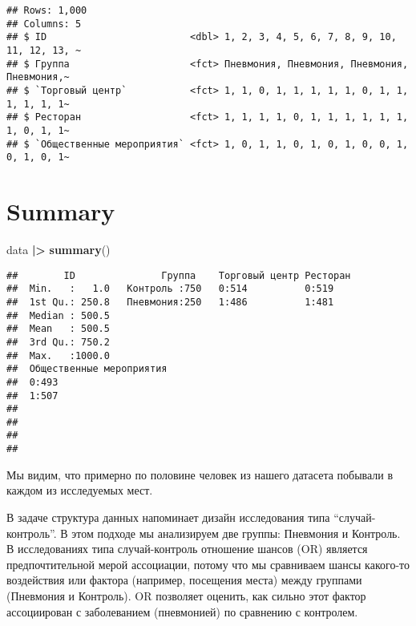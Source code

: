\documentclass[
]{article}
\newenvironment{Shaded}{\begin{snugshade}}{\end{snugshade}}
\newcommand{\FunctionTok}[1]{\textcolor[rgb]{0.13,0.29,0.53}{\textbf{#1}}}
\newcommand{\NormalTok}[1]{#1}
\newcommand{\SpecialCharTok}[1]{\textcolor[rgb]{0.81,0.36,0.00}{\textbf{#1}}}
\begin{document}
\begin{verbatim}
## Rows: 1,000
## Columns: 5
## $ ID                         <dbl> 1, 2, 3, 4, 5, 6, 7, 8, 9, 10, 11, 12, 13, ~
## $ Группа                     <fct> Пневмония, Пневмония, Пневмония, Пневмония,~
## $ `Торговый центр`           <fct> 1, 1, 0, 1, 1, 1, 1, 1, 0, 1, 1, 1, 1, 1, 1~
## $ Ресторан                   <fct> 1, 1, 1, 1, 0, 1, 1, 1, 1, 1, 1, 1, 0, 1, 1~
## $ `Общественные мероприятия` <fct> 1, 0, 1, 1, 0, 1, 0, 1, 0, 0, 1, 0, 1, 0, 1~
\end{verbatim}

\section{Summary}\label{summary-1}

\begin{Shaded}
\begin{Highlighting}[]
\NormalTok{data }\SpecialCharTok{|\textgreater{}} \FunctionTok{summary}\NormalTok{()}
\end{Highlighting}
\end{Shaded}

\begin{verbatim}
##        ID               Группа    Торговый центр Ресторан
##  Min.   :   1.0   Контроль :750   0:514          0:519   
##  1st Qu.: 250.8   Пневмония:250   1:486          1:481   
##  Median : 500.5                                          
##  Mean   : 500.5                                          
##  3rd Qu.: 750.2                                          
##  Max.   :1000.0                                          
##  Общественные мероприятия
##  0:493                   
##  1:507                   
##                          
##                          
##                          
## 
\end{verbatim}

Мы видим, что примерно по половине человек из нашего датасета побывали в
каждом из исследуемых мест.

В задаче структура данных напоминает дизайн исследования типа
``случай-контроль''. В этом подходе мы анализируем две группы: Пневмония
и Контроль. В исследованиях типа случай-контроль отношение шансов (OR)
является предпочтительной мерой ассоциации, потому что мы сравниваем
шансы какого-то воздействия или фактора (например, посещения места)
между группами (Пневмония и Контроль). OR позволяет оценить, как сильно
этот фактор ассоциирован с заболеванием (пневмонией) по сравнению с
контролем.
\end{document}

